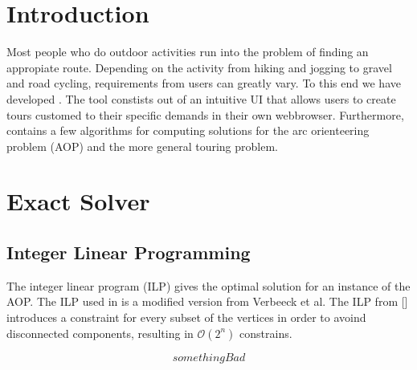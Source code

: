 \documentclass[acmsmall,natbib=false]{acmart}
\begin{document}


\maketitle

\section{Introduction}

Most people who do outdoor activities run into the problem of finding an appropiate route. 
Depending on the activity from hiking and jogging to gravel and road cycling, requirements from users can greatly vary.
To this end we have developed \tG. 
The tool \tG constists out of an intuitive UI that allows users to create tours customed to their specific demands in their own webbrowser. Furthermore, \tG contains a few algorithms for computing solutions for the arc orienteering problem (AOP) and the more general touring problem.

\newpage\section{Exact Solver}

\subsection{Integer Linear Programming}



The integer linear program (ILP) gives the optimal solution for an instance of the AOP. The ILP used in \tG is a modified version from Verbeeck et al. 
The ILP from [] introduces a constraint for every subset of the vertices in order to avoind disconnected components, resulting in $\mathcal{O}(2^n)$ constrains.

\begin{equation}
  something Bad
  \label{exponential_ILP}
\end{equation}
\end{document}
